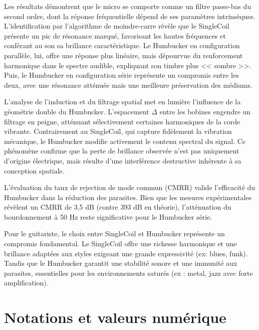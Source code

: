 \documentclass[11pt, a4paper]{article}
\begin{document}
Les résultats démontrent que le micro se comporte comme un filtre passe-bas du second ordre, dont la réponse fréquentielle dépend de ses paramètres intrinsèques. L'identification par l'algorithme de moindre-carre révèle que le SingleCoil présente un pic de résonance marqué, favorisant les hautes fréquences et conférant au son sa brillance caractéristique. Le Humbucker en configuration parallèle, lui, offre une réponse plus linéaire, mais dépourvue du renforcement harmonique dans le spectre audible, expliquant son timbre plus << sombre >>. Puis, le Humbucker en configuration série représente un compromis entre les deux, avec une résonance atténuée mais une meilleure préservation des médiums.

L'analyse de l'induction et du filtrage spatial met en lumière l'influence de la géométrie double du Humbucker. L'espacement $\Delta$ entre les bobines engendre un filtrage en peigne, atténuant sélectivement certaines harmoniques de la corde vibrante. Contrairement au SingleCoil, qui capture fidèlement la vibration mécanique, le Humbucker modifie activement le contenu spectral du signal. Ce phénomène confirme que la perte de brillance observée n'est pas uniquement d'origine électrique, mais résulte d'une interférence destructive inhérente à sa conception spatiale.

L'évaluation du taux de rejection de mode commun (CMRR) valide l'efficacité du Humbucker dans la réduction des parasites. Bien que les mesures expérimentales révèlent un CMRR de 3,5 dB (contre 393 dB en théorie), l'atténuation du bourdonnement à 50 Hz reste significative pour le Humbucker série.

Pour le guitariste, le choix entre SingleCoil et Humbucker représente un compromis fondamental. Le SingleCoil offre une richesse harmonique et une brillance adaptées aux styles exigeant une grande expressivité (ex: blues, funk). Tandis que le Humbucker garantit une stabilité sonore et une immunité aux parasites, essentielles pour les environnements saturés (ex : metal, jazz avec forte amplification).

\newpage
\section{Notations et valeurs numérique}
\end{document}
